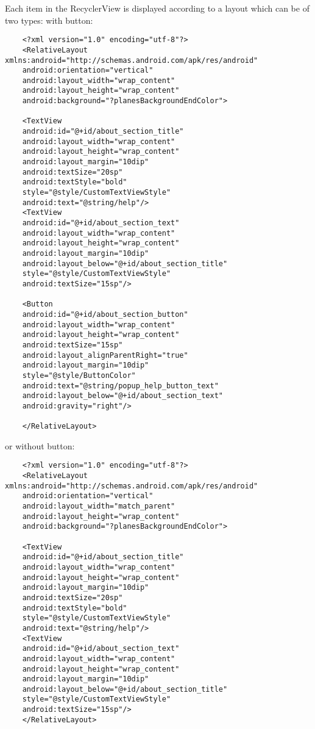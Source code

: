 Each item in the RecyclerView is displayed according to a layout which can be of two types: with button:

\begin{lstlisting}
	<?xml version="1.0" encoding="utf-8"?>
	<RelativeLayout xmlns:android="http://schemas.android.com/apk/res/android"
	android:orientation="vertical"
	android:layout_width="wrap_content"
	android:layout_height="wrap_content"
	android:background="?planesBackgroundEndColor">
	
	<TextView
	android:id="@+id/about_section_title"
	android:layout_width="wrap_content"
	android:layout_height="wrap_content"
	android:layout_margin="10dip"
	android:textSize="20sp"
	android:textStyle="bold"
	style="@style/CustomTextViewStyle"
	android:text="@string/help"/>
	<TextView
	android:id="@+id/about_section_text"
	android:layout_width="wrap_content"
	android:layout_height="wrap_content"
	android:layout_margin="10dip"
	android:layout_below="@+id/about_section_title"
	style="@style/CustomTextViewStyle"
	android:textSize="15sp"/>
	
	<Button
	android:id="@+id/about_section_button"
	android:layout_width="wrap_content"
	android:layout_height="wrap_content"
	android:textSize="15sp"
	android:layout_alignParentRight="true"
	android:layout_margin="10dip"
	style="@style/ButtonColor"
	android:text="@string/popup_help_button_text"
	android:layout_below="@+id/about_section_text"
	android:gravity="right"/>
	
	</RelativeLayout>
\end{lstlisting}

or without button:

\begin{lstlisting}
	<?xml version="1.0" encoding="utf-8"?>
	<RelativeLayout xmlns:android="http://schemas.android.com/apk/res/android"
	android:orientation="vertical"
	android:layout_width="match_parent"
	android:layout_height="wrap_content"
	android:background="?planesBackgroundEndColor">
	
	<TextView
	android:id="@+id/about_section_title"
	android:layout_width="wrap_content"
	android:layout_height="wrap_content"
	android:layout_margin="10dip"
	android:textSize="20sp"
	android:textStyle="bold"
	style="@style/CustomTextViewStyle"
	android:text="@string/help"/>
	<TextView
	android:id="@+id/about_section_text"
	android:layout_width="wrap_content"
	android:layout_height="wrap_content"
	android:layout_margin="10dip"
	android:layout_below="@+id/about_section_title"
	style="@style/CustomTextViewStyle"
	android:textSize="15sp"/>
	</RelativeLayout>
\end{lstlisting}

